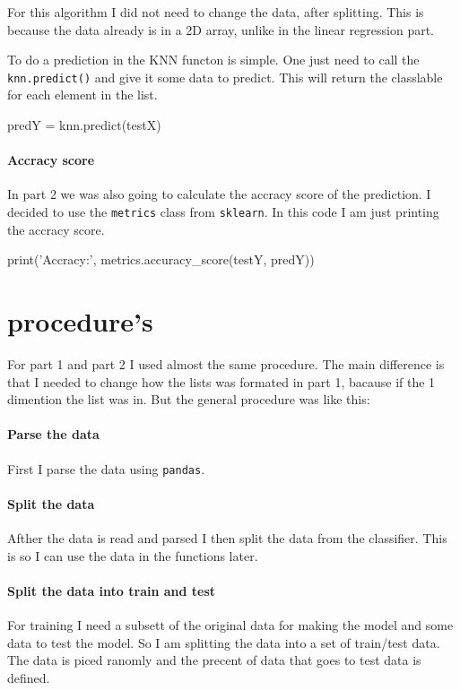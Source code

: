 \documentclass[11pt]{article}
\begin{document}
        For this algorithm I did not need to change the data, after splitting. This is because the data already is in a 2D array, unlike in the linear regression part.

        To do a prediction in the KNN functon is simple. One just need to call the \texttt{knn.predict()} and give it some data to predict. This will return the classlable for each element in the list.

        \begin{pythoncode}
    predY = knn.predict(testX)
        \end{pythoncode}

        \paragraph{Accracy score}
        In part 2 we was also going to calculate the accracy score of the prediction. I decided to use the \texttt{metrics} class from \texttt{sklearn}. In this code I am just printing the accracy score.

        \begin{pythoncode}
    print('Accracy:', metrics.accuracy_score(testY, predY))
        \end{pythoncode}
    
    \section{procedure's}
    For part 1 and part 2 I used almost the same procedure. The main difference is that I needed to change how the lists was formated in part 1, bacause if the 1 dimention the list was in. But the general procedure was like this:

    \paragraph{Parse the data}
    First I parse the data using \texttt{pandas}.

    \paragraph{Split the data}
    Afther the data is read and parsed I then split the data from the classifier. This is so I can use the data in the functions later.

    \paragraph{Split the data into train and test}
    For training I need a subsett of the original data for making the model and some data to test the model. So I am splitting the data into a set of train/test data. The data is piced ranomly and the precent of data that goes to test data is defined.
\end{document}
